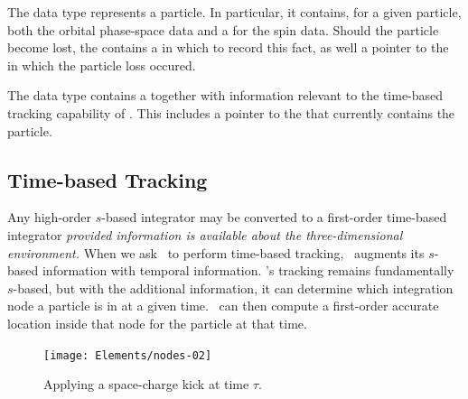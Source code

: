 %
The data type  represents a particle. In particular,
it contains, for a given particle, both the orbital phase-space data
and a  for the spin data. Should the particle become
lost, the  contains a  in which to
record this fact, as well a pointer to the 
in which the particle loss occured.

%
The data type  contains a 
together with information relevant to the time-based tracking
capability of \PTC. This includes a pointer to the
 that currently contains the particle.
\makeussubscript


\subsection{Time-based Tracking}
\label{sec:pseudo.time}

%
Any high-order $s$-based integrator may be converted to a
first-order time-based integrator \emph{provided information
is available about the three-dimensional environment.} When
we ask \PTC\ to perform time-based tracking, \PTC\ augments
its $s$-based information with temporal information. \PTC's
tracking remains fundamentally $s$-based, but with the
additional information, it can determine which integration
node a particle is in at a given time. \PTC\ can
then compute a first-order accurate location inside that node
for the particle at that time.

\begin{figure}[ht]
  \centering
  \texttt{[image: Elements/nodes-02]}
  \caption{Applying a space-charge kick at time $\tau$.}
  \label{fig:sc.kick}
\end{figure}

